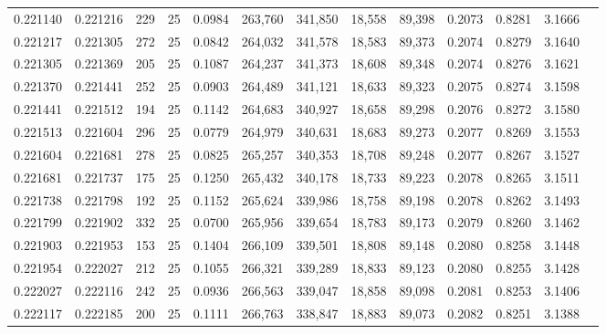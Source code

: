 \begin{tabular}{rrrrrrrrrrrrr}
0.221140 & 0.221216 &   229 &  25 &                                     0.0984 & 263,760 & 341,850 &  18,558 &  89,398 & 0.2073 & 0.8281 & 3.1666 \\
0.221217 & 0.221305 &   272 &  25 &                                     0.0842 & 264,032 & 341,578 &  18,583 &  89,373 & 0.2074 & 0.8279 & 3.1640 \\
0.221305 & 0.221369 &   205 &  25 &                                     0.1087 & 264,237 & 341,373 &  18,608 &  89,348 & 0.2074 & 0.8276 & 3.1621 \\
0.221370 & 0.221441 &   252 &  25 &                                     0.0903 & 264,489 & 341,121 &  18,633 &  89,323 & 0.2075 & 0.8274 & 3.1598 \\
0.221441 & 0.221512 &   194 &  25 &                                     0.1142 & 264,683 & 340,927 &  18,658 &  89,298 & 0.2076 & 0.8272 & 3.1580 \\
0.221513 & 0.221604 &   296 &  25 &                                     0.0779 & 264,979 & 340,631 &  18,683 &  89,273 & 0.2077 & 0.8269 & 3.1553 \\
0.221604 & 0.221681 &   278 &  25 &                                     0.0825 & 265,257 & 340,353 &  18,708 &  89,248 & 0.2077 & 0.8267 & 3.1527 \\
0.221681 & 0.221737 &   175 &  25 &                                     0.1250 & 265,432 & 340,178 &  18,733 &  89,223 & 0.2078 & 0.8265 & 3.1511 \\
0.221738 & 0.221798 &   192 &  25 &                                     0.1152 & 265,624 & 339,986 &  18,758 &  89,198 & 0.2078 & 0.8262 & 3.1493 \\
0.221799 & 0.221902 &   332 &  25 &                                     0.0700 & 265,956 & 339,654 &  18,783 &  89,173 & 0.2079 & 0.8260 & 3.1462 \\
0.221903 & 0.221953 &   153 &  25 &                                     0.1404 & 266,109 & 339,501 &  18,808 &  89,148 & 0.2080 & 0.8258 & 3.1448 \\
0.221954 & 0.222027 &   212 &  25 &                                     0.1055 & 266,321 & 339,289 &  18,833 &  89,123 & 0.2080 & 0.8255 & 3.1428 \\
0.222027 & 0.222116 &   242 &  25 &                                     0.0936 & 266,563 & 339,047 &  18,858 &  89,098 & 0.2081 & 0.8253 & 3.1406 \\
0.222117 & 0.222185 &   200 &  25 &                                     0.1111 & 266,763 & 338,847 &  18,883 &  89,073 & 0.2082 & 0.8251 & 3.1388 \\

\end{tabular}
